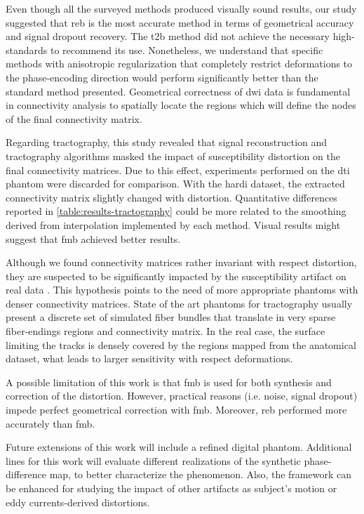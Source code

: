 Even though all the surveyed methods produced visually 
sound results, our study suggested that \gls*{reb} is the 
most accurate method in terms of geometrical accuracy and
signal dropout recovery. 
The \gls*{t2b} method did not achieve the necessary high-standards
to recommend its use. Nonetheless, we understand that specific
methods with anisotropic regularization that completely
restrict deformations to the phase-encoding direction would perform
significantly better than the standard method presented.
Geometrical correctness of \gls*{dwi} data is fundamental 
in connectivity analysis to spatially locate the
regions which will define the nodes of the final connectivity
matrix.

Regarding tractography, this study revealed that signal
reconstruction and tractography algorithms masked the 
impact of susceptibility distortion on the final connectivity
matrices. Due to this effect, experiments performed on 
the \gls*{dti} phantom were discarded for comparison.
With the \gls*{hardi} dataset, the extracted 
connectivity matrix slightly
changed with distortion. Quantitative differences reported in
\autoref{table:results-tractography} could be more related
to the smoothing derived from interpolation implemented by
each method. Visual results might suggest that \gls*{fmb}
achieved better results.

Although we found connectivity matrices rather invariant with
respect distortion, they are suspected to be significantly
impacted by the susceptibility artifact on real data 
\cite{irfanoglu_effects_2012}.
This hypothesis points to the need of more appropriate 
phantoms with denser connectivity matrices.
State of the art phantoms for tractography usually present a
discrete set of simulated fiber bundles that translate in 
very sparse fiber-endings regions and connectivity matrix.
In the real case, the surface limiting the tracks is densely 
covered by the regions mapped from the anatomical 
dataset, what leads to larger sensitivity with respect 
deformations.

A possible limitation of this work is that \gls*{fmb} is
used for both synthesis and correction of the distortion.
However, practical reasons (i.e. noise, signal dropout)
impede perfect geometrical correction with \gls*{fmb}.
Moreover, \gls*{reb} performed more accurately 
than \gls*{fmb}.

Future extensions of this work will include a 
refined digital phantom. Additional lines for this
work will evaluate different realizations of the 
synthetic phase-difference map, to better characterize
the phenomenon. Also, the framework can be enhanced 
for studying the impact of other artifacts as 
subject's motion or eddy currents-derived distortions.